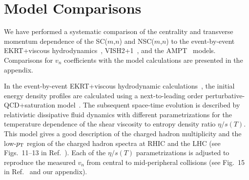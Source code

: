 \section{Model Comparisons}
\label{sec:theory}
We have performed a systematic comparison of the centrality and transverse momentum dependence of the SC($m$,$n$) and NSC($m$,$n$) to the event-by-event  EKRT+viscous hydrodynamics~\cite{Niemi:2015qia}, VISH2+1~\cite{Shen:2010uy,Shen:2014vra}, and the AMPT~\cite{Qian:2016pau,Lin:2004en,Lin:2014tya} models. Comparisons for $v_n$ coefficients with the model calculations are presented in the appendix.

In the event-by-event EKRT+viscous hydrodynamic calculations~\cite{Niemi:2015qia}, the initial energy density profiles are calculated using a next-to-leading order perturbative-QCD+saturation model~\cite{Paatelainen:2012at,Paatelainen:2013eea}. The subsequent space-time evolution is described by relativistic dissipative fluid dynamics with different parametrizations for the temperature dependence of the shear viscosity to entropy density ratio $\eta/s(T)$. 
This model gives a good description of the charged hadron multiplicity and the low-$p_{\rm T}$ region of the charged hadron spectra at RHIC and the LHC (see Figs.~11--13 in Ref.~\cite{Niemi:2015qia}).
Each of the $\eta/s(T)$ parametrizations is adjusted to reproduce the measured $v_n$ from central to mid-peripheral collisions (see Fig.~15 in Ref.~\cite{Niemi:2015qia} and our appendix). 

